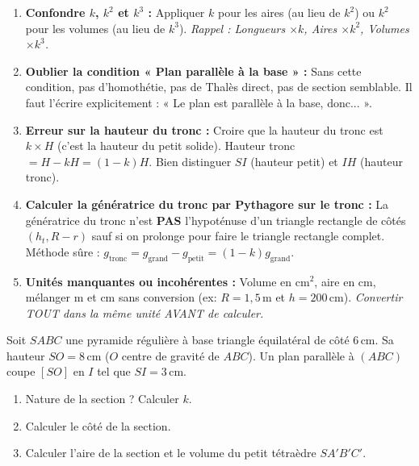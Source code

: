 \documentclass[11pt]{article}
\begin{document}
\begin{attention}
    \begin{enumerate}
        \item \textbf{Confondre $k$, $k^2$ et $k^3$ :} Appliquer $k$ pour les aires (au lieu de $k^2$) ou $k^2$ pour les volumes (au lieu de $k^3$). \emph{Rappel : Longueurs $\times k$, Aires $\times k^2$, Volumes $\times k^3$.}
        \item \textbf{Oublier la condition « Plan parallèle à la base » :} Sans cette condition, pas d'homothétie, pas de Thalès direct, pas de section semblable. Il faut l'écrire explicitement : « Le plan est parallèle à la base, donc... ».
        \item \textbf{Erreur sur la hauteur du tronc :} Croire que la hauteur du tronc est $k \times H$ (c'est la hauteur du petit solide). Hauteur tronc $= H - kH = (1-k)H$. Bien distinguer $SI$ (hauteur petit) et $IH$ (hauteur tronc).
        \item \textbf{Calculer la génératrice du tronc par Pythagore sur le tronc :} La génératrice du tronc n'est \textbf{PAS} l'hypoténuse d'un triangle rectangle de côtés $(h_t, R-r)$ sauf si on prolonge pour faire le triangle rectangle complet. Méthode sûre : $g_{\text{tronc}} = g_{\text{grand}} - g_{\text{petit}} = (1-k)g_{\text{grand}}$.
        \item \textbf{Unités manquantes ou incohérentes :} Volume en $\text{cm}^2$, aire en $\text{cm}$, mélanger $\text{m}$ et $\text{cm}$ sans conversion (ex: $R=1,5\,\text{m}$ et $h=200\,\text{cm}$). \emph{Convertir TOUT dans la même unité AVANT de calculer.}
    \end{enumerate}
\end{attention}

\begin{exercice}
    Soit $SABC$ une pyramide régulière à base triangle équilatéral de côté $6\,\text{cm}$. Sa hauteur $SO = 8\,\text{cm}$ ($O$ centre de gravité de $ABC$). Un plan parallèle à $(ABC)$ coupe $[SO]$ en $I$ tel que $SI = 3\,\text{cm}$.
    \begin{enumerate}
        \item Nature de la section ? Calculer $k$.
        \item Calculer le côté de la section.
        \item Calculer l'aire de la section et le volume du petit tétraèdre $SA'B'C'$.
    \end{enumerate}
\end{exercice}
\end{document}
